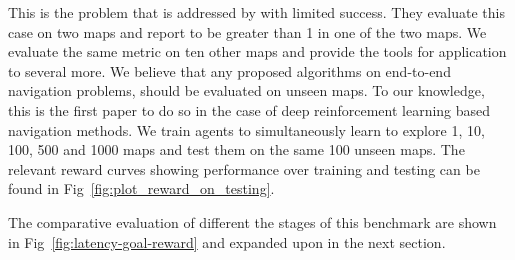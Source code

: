 \begin{description}
  This is the problem that is addressed by \cite{MiPaViICLR2017} with limited success. 
  They evaluate this case on two maps and report \LatencyOneGtOne{} to be greater than 1 in one of the two maps. We evaluate the same metric on ten other maps and provide the tools for application to several more.
    We believe that any proposed algorithms on end-to-end navigation problems, should be evaluated on unseen maps.
    To our knowledge, this is the first paper to do so in the case of deep reinforcement learning based navigation methods.
    We train agents to simultaneously learn to explore 1, 10, 100, 500 and 1000 maps and test them on the same 100 unseen maps. The relevant reward curves showing performance over training and testing can be found in Fig~\ref{fig:plot_reward_on_testing}. 
\end{description}

The comparative evaluation of different the stages of this benchmark are shown in Fig~\ref{fig:latency-goal-reward} and expanded upon in the next section.

%
%        

